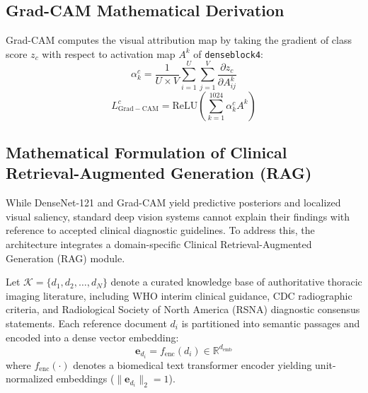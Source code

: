 \documentclass[12pt,a4paper]{report}
\begin{document}
\subsection{Grad-CAM Mathematical Derivation}
Grad-CAM computes the visual attribution map by taking the gradient of class score $z_c$ with respect to activation map $A^k$ of \texttt{denseblock4}:
\begin{equation}
    \alpha_k^c = \frac{1}{U \times V} \sum_{i=1}^U \sum_{j=1}^V \frac{\partial z_c}{\partial A_{ij}^k}
\end{equation}
\begin{equation}
    L_{\mathrm{Grad-CAM}}^c = \mathrm{ReLU}\left( \sum_{k=1}^{1024} \alpha_k^c A^k \right)
\end{equation}
\subsection{Mathematical Formulation of Clinical Retrieval-Augmented Generation (RAG)}
While DenseNet-121 and Grad-CAM yield predictive posteriors and localized visual saliency, standard deep vision systems cannot explain their findings with reference to accepted clinical diagnostic guidelines. To address this, the architecture integrates a domain-specific Clinical Retrieval-Augmented Generation (RAG) module.

Let $\mathcal{K} = \{d_1, d_2, \dots, d_N\}$ denote a curated knowledge base of authoritative thoracic imaging literature, including WHO interim clinical guidance, CDC radiographic criteria, and Radiological Society of North America (RSNA) diagnostic consensus statements. Each reference document $d_i$ is partitioned into semantic passages and encoded into a dense vector embedding:
\begin{equation}
    \mathbf{e}_{d_i} = f_{\text{enc}}(d_i) \in \mathbb{R}^{d_{\text{emb}}}
\end{equation}
where $f_{\text{enc}}(\cdot)$ denotes a biomedical text transformer encoder yielding unit-normalized embeddings ($\|\mathbf{e}_{d_i}\|_2 = 1$).
\end{document}
